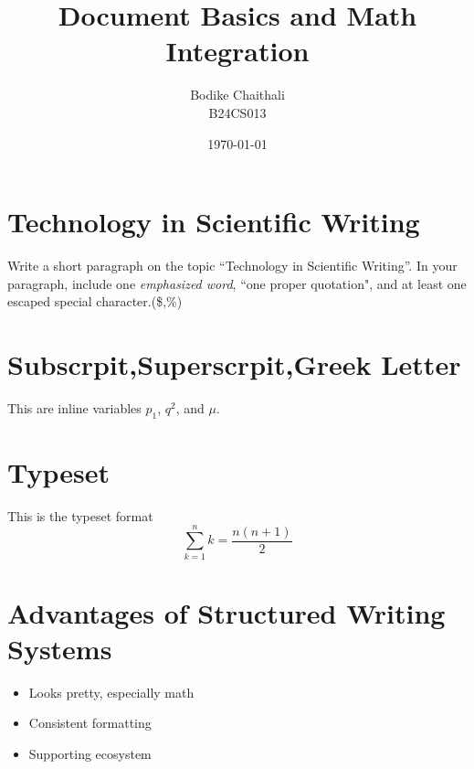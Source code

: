 \documentclass{article}
\title{Document Basics and Math Integration}
\author{Bodike Chaithali \\ B24CS013}
\date{\today}
\begin{document}
	\maketitle
	\section{Technology in Scientific Writing}
	Write a short paragraph on the topic ``Technology in Scientific Writing”. In your
	paragraph, include one \emph{emphasized word}, ``one proper quotation", and at least one escaped special character.(\$,\%)
	\section{Subscrpit,Superscrpit,Greek Letter}
	This are inline variables $p_1$, $q^2$, and $\mu$.
	\section{Typeset}
	This is the typeset format
	\[\sum_{k=1}^{n} k=\frac{n(n+1)}{2}\]
	\section{Advantages of Structured Writing Systems}
	\begin{itemize}
		\item Looks pretty, especially math
		\item Consistent formatting
		\item Supporting ecosystem
	\end{itemize}
\end{document}
